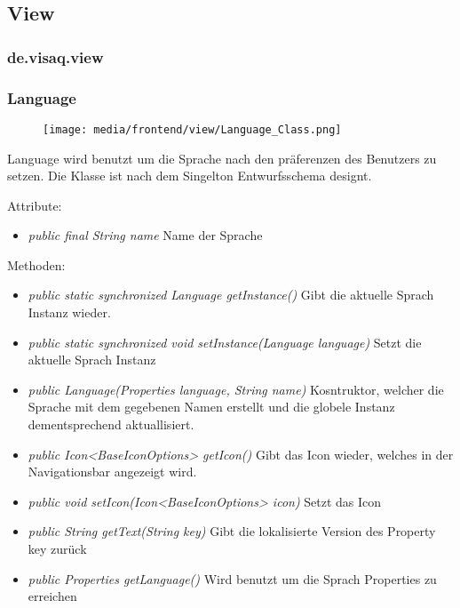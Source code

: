 \subsection{View}



\subsubsection{de.visaq.view}

\subsubsection {Language}
\begin{minipage}{0.3\textwidth}
    \begin{figure}[H]
        \texttt{[image: media/frontend/view/Language\_Class.png]}
    \end{figure}
    \end{minipage} \hfill
    \begin{minipage}{0.6\textwidth}
    Language wird benutzt um die Sprache nach den präferenzen des Benutzers zu setzen. Die Klasse ist nach dem Singelton Entwurfsschema designt.
    \end{minipage}

Attribute:
\begin{itemize} 
    \item \emph{public final String name} Name der Sprache
\end{itemize}
Methoden:
\begin{itemize} 
    \item \emph{public static synchronized Language getInstance()} Gibt die aktuelle Sprach Instanz wieder.
    \item \emph{public static synchronized void setInstance(Language language)} Setzt die aktuelle Sprach Instanz
    \item \emph{public Language(Properties language, String name)} Kosntruktor, welcher die Sprache mit dem gegebenen Namen erstellt und die globele Instanz dementsprechend aktuallisiert.
    \item \emph{public Icon<BaseIconOptions> getIcon()} Gibt das Icon wieder, welches in der Navigationsbar angezeigt wird.
    \item \emph{public void setIcon(Icon<BaseIconOptions> icon)} Setzt das Icon
    \item \emph{public String getText(String key)} Gibt die lokalisierte Version des Property key zurück
    \item \emph{public Properties getLanguage()} Wird benutzt um die Sprach Properties zu erreichen
\end{itemize}


